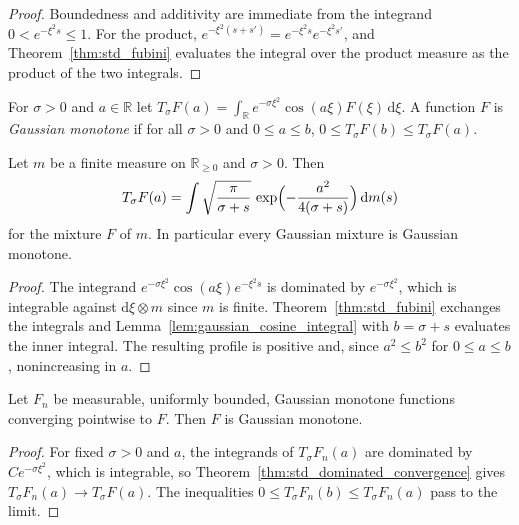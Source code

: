 \begin{proof}
\leanok
Boundedness and additivity are immediate from the integrand $0 < e^{-\xi^2 s} \le 1$. For the product, $e^{-\xi^2 (s + s')} = e^{-\xi^2 s} e^{-\xi^2 s'}$, and Theorem~\ref{thm:std_fubini} evaluates the integral over the product measure as the product of the two integrals.
\end{proof}

\begin{definition}\label{def:gauss_cos}
\leanok
For $\sigma > 0$ and $a \in \mathbb{R}$ let $T_\sigma F(a) = \int_{\mathbb{R}} e^{-\sigma \xi^2} \cos(a \xi) F(\xi)\, \mathrm{d}\xi$. A function $F$ is \emph{Gaussian monotone} if for all $\sigma > 0$ and $0 \le a \le b$, $0 \le T_\sigma F(b) \le T_\sigma F(a)$.
\end{definition}

\begin{theorem}\label{thm:gauss_mixture_monotone}
\leanok
Let $m$ be a finite measure on $\mathbb{R}_{\ge 0}$ and $\sigma > 0$. Then
\[
  T_\sigma F(a) = \int \sqrt{\frac{\pi}{\sigma + s}}\, \exp\Bigl(-\frac{a^2}{4(\sigma + s)}\Bigr)\, \mathrm{d}m(s)
\]
for the mixture $F$ of $m$. In particular every Gaussian mixture is Gaussian monotone.
\end{theorem}

\begin{proof}
\leanok
The integrand $e^{-\sigma \xi^2} \cos(a \xi) e^{-\xi^2 s}$ is dominated by $e^{-\sigma \xi^2}$, which is integrable against $\mathrm{d}\xi \otimes m$ since $m$ is finite. Theorem~\ref{thm:std_fubini} exchanges the integrals and Lemma~\ref{lem:gaussian_cosine_integral} with $b = \sigma + s$ evaluates the inner integral. The resulting profile is positive and, since $a^2 \le b^2$ for $0 \le a \le b$, nonincreasing in $a$.
\end{proof}

\begin{theorem}\label{thm:gauss_monotone_limit}
\leanok
Let $F_n$ be measurable, uniformly bounded, Gaussian monotone functions converging pointwise to $F$. Then $F$ is Gaussian monotone.
\end{theorem}

\begin{proof}
\leanok
For fixed $\sigma > 0$ and $a$, the integrands of $T_\sigma F_n(a)$ are dominated by $C e^{-\sigma \xi^2}$, which is integrable, so Theorem~\ref{thm:std_dominated_convergence} gives $T_\sigma F_n(a) \to T_\sigma F(a)$. The inequalities $0 \le T_\sigma F_n(b) \le T_\sigma F_n(a)$ pass to the limit.
\end{proof}
